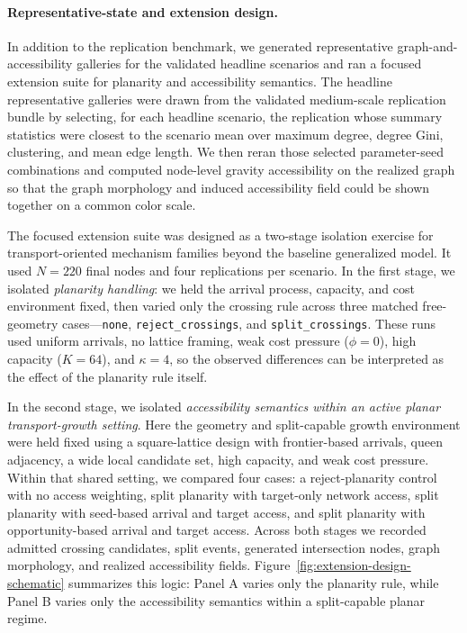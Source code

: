 
\paragraph{Representative-state and extension design.}
In addition to the replication benchmark, we generated representative
graph-and-accessibility galleries for the validated headline scenarios and ran
a focused extension suite for planarity and accessibility semantics. The
headline representative galleries were drawn from the validated medium-scale
replication bundle by selecting, for each headline scenario, the replication
whose summary statistics were closest to the scenario mean over maximum degree,
degree Gini, clustering, and mean edge length. We then reran those selected
parameter-seed combinations and computed node-level gravity accessibility on the
realized graph so that the graph morphology and induced accessibility field
could be shown together on a common color scale.

The focused extension suite was designed as a two-stage isolation exercise for
transport-oriented mechanism families beyond the baseline generalized model. It
used $N=220$ final nodes and four replications per scenario. In the first
stage, we isolated \emph{planarity handling}: we held the arrival process,
capacity, and cost environment fixed, then varied only the crossing rule across
three matched free-geometry cases---\texttt{none},
\texttt{reject\_crossings}, and \texttt{split\_crossings}. These runs used
uniform arrivals, no lattice framing, weak cost pressure ($\phi=0$), high
capacity ($K=64$), and $\kappa=4$, so the observed differences can be
interpreted as the effect of the planarity rule itself.

In the second stage, we isolated \emph{accessibility semantics within an active
planar transport-growth setting}. Here the geometry and split-capable growth
environment were held fixed using a square-lattice design with frontier-based
arrivals, queen adjacency, a wide local candidate set, high capacity, and weak
cost pressure. Within that shared setting, we compared four cases: a
reject-planarity control with no access weighting, split planarity with
target-only network access, split planarity with seed-based arrival and target
access, and split planarity with opportunity-based arrival and target access.
Across both stages we recorded admitted crossing candidates, split events,
generated intersection nodes, graph morphology, and realized accessibility
fields. Figure~\ref{fig:extension-design-schematic} summarizes this logic:
Panel A varies only the planarity rule, while Panel B varies only the
accessibility semantics within a split-capable planar regime.


